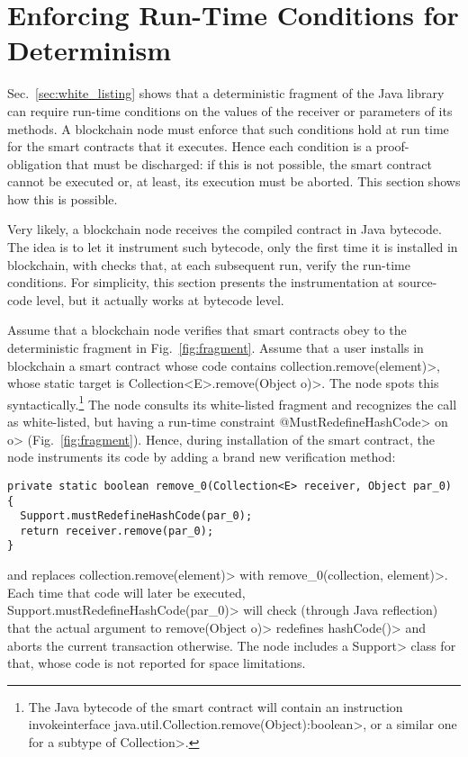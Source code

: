 \section{Enforcing Run-Time Conditions for Determinism}\label{sec:enforcing}

Sec.~\ref{sec:white_listing} shows that a deterministic fragment of the Java library
can require run-time conditions on the values of the receiver or
parameters of its methods. A blockchain node must enforce that such conditions hold
at run time for the smart contracts that it executes. Hence each condition
is a proof-obligation that must be discharged: if this is not possible, the smart contract
cannot be executed or, at least, its execution must be aborted. This section shows how
this is possible.

Very likely, a blockchain node receives the compiled contract in Java bytecode.
The idea is to let it instrument such bytecode, only the first time it is installed in blockchain,
with checks that, at each subsequent run, verify the run-time conditions.
For simplicity, this section presents
the instrumentation at source-code level, but it actually works at bytecode level.

Assume that a blockchain node verifies that smart contracts obey to the deterministic
fragment in Fig.~\ref{fig:fragment}.
Assume that a user installs in blockchain a smart contract whose
code contains \<collection.remove(element)>, whose static target is
\<Collection$\text{<}$E$\text{>}$.remove(Object o)>.
The node spots this syntactically.\footnote{The Java bytecode of the
  smart contract will
  contain an instruction \<invokeinterface java.util.Collection.remove(Object):boolean>,
  or a similar one for a subtype of \<Collection>.}
The node consults its white-listed fragment and recognizes the call as
white-listed, but having a run-time constraint \<@MustRedefineHashCode> on \<o>
(Fig.~\ref{fig:fragment}). Hence, during installation of the
smart contract, the node instruments its code by adding a brand new
verification method:

{\small\begin{verbatim}
private static boolean remove_0(Collection<E> receiver, Object par_0) {
  Support.mustRedefineHashCode(par_0);
  return receiver.remove(par_0);
}
\end{verbatim}}

\noindent
and replaces \<collection.remove(element)> with \<remove\_0(collection, element)>.
Each time that code will later be executed,
\<Support.mustRedefineHashCode(par\_0)> will check (through Java reflection)
that the actual argument
to \<remove(Object o)> redefines \<hashCode()> and aborts
the current transaction otherwise. The node includes a
\<Support> class for that, whose
code is not reported for space limitations.

